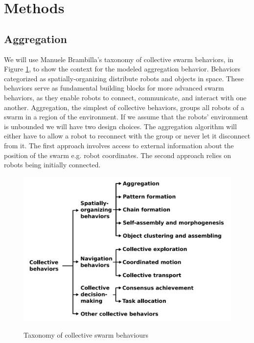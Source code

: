 \section{Methods}



\subsection{Aggregation}
We will use Manuele Brambilla's \cite{Brambilla2013} taxonomy of collective swarm behaviors, in Figure \ref{fig:taxonomy}, to show the context for the modeled aggregation behavior. Behaviors categorized as spatially-organizing distribute robots and objects in space. These behaviors serve as fundamental building blocks for more advanced swarm behaviors, as they enable robots to connect, communicate, and interact with one another. Aggregation, the simplest of collective behaviors, groups all robots of a swarm in a region of the environment. If we assume that the robots' environment is unbounded we will have two design choices. The aggregation algorithm will either have to allow a robot to reconnect with the group or never let it disconnect from it. The first approach involves access to external information about the position of the swarm e.g. robot coordinates. The second approach relies on robots being initially connected.

\begin{figure}[H]
\caption{Taxonomy of collective swarm behaviours \cite{Brambilla2013}}
\includegraphics[width=\textwidth]{images/taxonomy.png}
\label{fig:taxonomy}
\end{figure}



